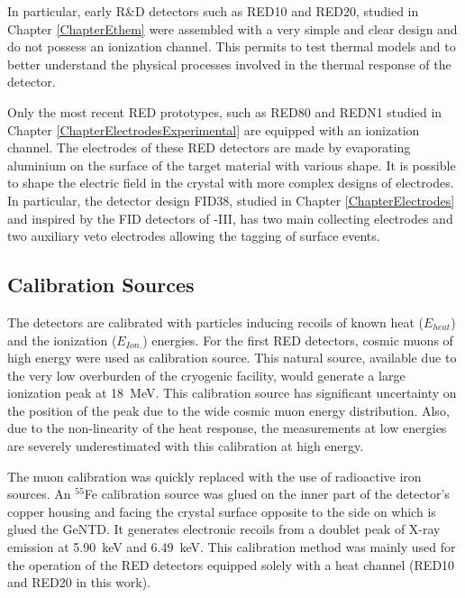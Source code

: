 In particular, early R\&D detectors such as RED10 and RED20, studied in Chapter \ref{ChapterEthem} were assembled with a very simple and clear design and do not possess an ionization channel. This permits to test thermal models and to better understand the physical processes involved in the thermal response of the detector.

Only the most recent RED prototypes, such as RED80 and REDN1 studied in Chapter \ref{ChapterElectrodesExperimental} are equipped with an ionization channel.
The electrodes of these RED detectors are made by evaporating aluminium on the surface of the target material with various shape. It is possible to shape the electric field in the crystal with more complex designs of electrodes. In particular, the detector design FID38, studied in Chapter \ref{ChapterElectrodes} and inspired by the FID detectors of \Edelweiss{}-III, has two main collecting electrodes and two auxiliary veto electrodes allowing the tagging of surface events.





\subsection{Calibration Sources}
\label{par:calibration-source}
\label{par:calibration-sources}

The detectors are calibrated with particles inducing recoils of known heat ($E_{heat}$) and the ionization ($E_{Ion.}$) energies.
For the first RED detectors, cosmic muons of high energy were used as calibration source. This natural source, available due to the very low overburden of the cryogenic facility, would generate a large ionization peak at \SI{18}{\mega\eV}. This calibration source has significant uncertainty on the position of the peak due to the wide cosmic muon energy distribution. Also, due to the non-linearity of the heat response, the measurements at low energies are severely underestimated with this calibration at high energy.

The muon calibration was quickly replaced with the use of radioactive iron sources.
An $^{55}$Fe calibration source was glued on the inner part of the detector's copper housing and facing the crystal surface opposite to the side on which is glued the GeNTD. It generates electronic recoils from a doublet peak of X-ray emission at \SI{5.90}{\kilo\eV} and \SI{6.49}{\kilo\eV}. This calibration method was mainly used for the operation of the RED detectors equipped solely with a heat channel (RED10 and RED20 in this work).

